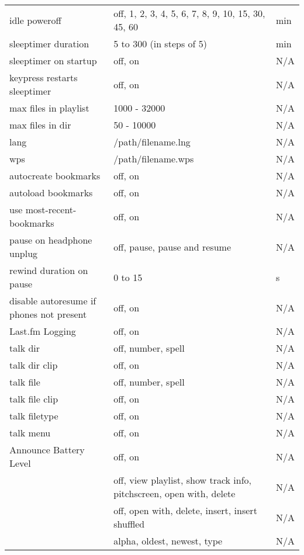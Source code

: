 \begin{center}
\begin{longtable}{>{\raggedright}p{}>{\raggedright}p{}p{}}
    idle poweroff   & off, 1, 2, 3, 4, 5, 6, 7, 8, 9, 10, 15, 30, 45, 60
                                        & min\\
    sleeptimer duration   & 5 to 300 (in steps of 5)
                                        & min\\
    sleeptimer on startup & off, on     & N/A\\
    keypress restarts sleeptimer & off, on & N/A\\
    max files in playlist & 1000 - 32000 & N/A\\
    max files in dir & 50 - 10000       & N/A\\
    lang            & /path/filename.lng & N/A\\
    wps             & /path/filename.wps & N/A\\
    autocreate bookmarks
                    & off, on           & N/A\\
    autoload bookmarks
                    & off, on           & N/A\\
    use most-recent-bookmarks
                    & off, on           & N/A\\
    pause on headphone unplug & off, pause, pause and resume & N/A\\
    rewind duration on pause & 0 to 15  & s\\
    disable autoresume if phones not present & off, on & N/A\\
    Last.fm Logging & off, on           & N/A\\
    talk dir        & off, number, spell& N/A\\
    talk dir clip   & off, on           & N/A\\
    talk file       & off, number, spell& N/A\\
    talk file clip  & off, on           & N/A\\
    talk filetype   & off, on           & N/A\\
    talk menu       & off, on           & N/A\\
    Announce Battery Level & off, on    & N/A\\
    \opt{hotkey}{
    hotkey wps      & off, view playlist, show track info,
        pitchscreen, open with, delete  & N/A\\
    \nopt{touchscreen}{hotkey tree     & off, open with, delete, insert,
        insert shuffled                 & N/A\\}
    }
    sort files      & alpha, oldest, newest, type & N/A\\

\end{longtable}
\end{center}
